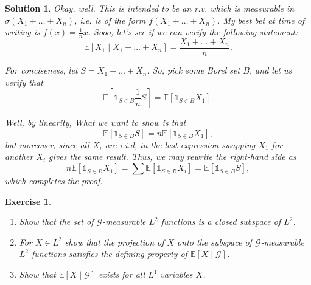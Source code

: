\documentclass{article}
\newtheorem{ex}{Exercise}
\theoremstyle{nonumberplain}
\newtheorem{sol}{Solution}
\newcommand{\ind}{\mathds{1}}
\newcommand{\EV}{\mathbb{E}}
\newcommand{\sa}[1]{\mathcal{#1}}
\begin{document}
\begin{sol}
Okay, well. This is intended to be an r.v. which is measurable in $\sigma(X_1 + \dots + X_n)$, i.e. is of the form $f(X_1 + \dots + X_n)$. My best bet at time of writing is $f(x) = \frac1n x$. Sooo, let's see if we can verify the following statement:
\begin{equation}
\EV[X_1 \mid X_1 + \dots + X_n] = \frac{X_1 + \dots + X_n}n.
\end{equation}

For conciseness, let $S = X_1 + \dots + X_n$. So, pick some Borel set $B$, and let us verify that
\begin{equation}
\EV[\ind_{S \in B} \frac1n S] = \EV[\ind_{S \in B} X_1].
\end{equation}

Well, by linearity, What we want to show is that
\begin{equation}
\EV[\ind_{S \in B} S] = n \EV[\ind_{S \in B} X_1],
\end{equation}
but moreover, since all $X_i$ are i.i.d, in the last expression swapping $X_1$ for another $X_i$ gives the same result. Thus, we may rewrite the right-hand side as
\begin{equation}
n \EV[\ind_{S \in B} X_1] = \sum \EV[\ind_{S \in B} X_i] = \EV[\ind_{S \in B} S],
\end{equation}
which completes the proof.
\end{sol}

\begin{ex}
\leavevmode
\begin{enumerate}
\item Show that the set of $\sa G$-measurable $L^2$ functions is a closed subspace of $L^2$.
\item For $X \in L^2$ show that the projection of $X$ onto the subspace of $\sa G$-measurable $L^2$ functions satisfies the defining property of $\EV[X \mid \sa G]$.
\item Show that $\EV[X \mid \sa G]$ exists for all $L^1$ variables $X$.
\end{enumerate}
\end{ex}
\end{document}
